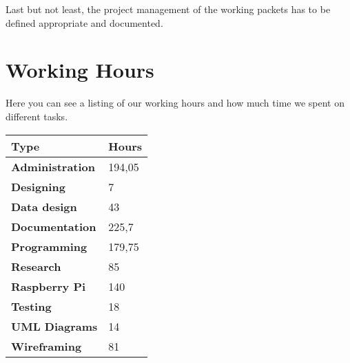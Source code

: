 Last but not least, the project management of the working packets has to be defined appropriate and documented.
\section*{Working Hours}
Here you can see a listing of our working hours and how much time we spent on different tasks. \newline
\begin{center}
\begin{tabular}{p{5cm}p{2cm}}
\toprule
\textbf{Type} & \textbf{Hours} \\
\midrule
\textbf{Administration} & 194,05 \\
\textbf{Designing} & 7 \\
\textbf{Data design} & 43 \\
\textbf{Documentation} & 225,7 \\
\textbf{Programming} & 179,75 \\
\textbf{Research} & 85 \\
\textbf{Raspberry Pi} & 140 \\
\textbf{Testing} & 18 \\
\textbf{UML Diagrams} & 14 \\
\textbf{Wireframing} & 81 \\
\bottomrule
\end{tabular}
\end{center}
